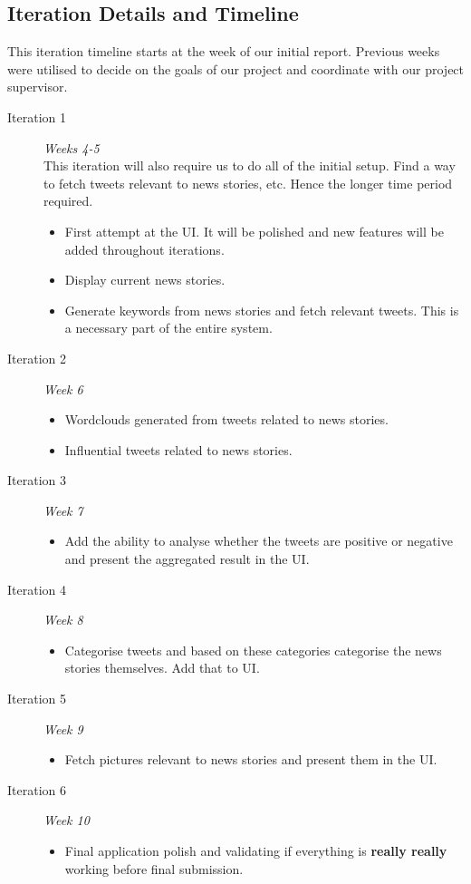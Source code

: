\documentclass[a4paper,12pt]{article}
\begin{document}
  \subsection{Iteration Details and Timeline}
  This iteration timeline starts at the week of our initial report. Previous weeks were utilised to decide on the goals of our project and coordinate with our project supervisor.
  \begin{description}
   \item[Iteration 1] \emph{Weeks 4-5}\\
   This iteration will also require us to do all of the initial setup. Find a way to fetch tweets relevant to news stories, etc. Hence the longer time period required.
   \begin{itemize}
     \item First attempt at the UI. It will be polished and new features will be added throughout iterations.
     \item Display current news stories.
     \item Generate keywords from news stories and fetch relevant tweets. This is a necessary part of the entire system.
   \end{itemize}
   \item[Iteration 2] \emph{Week 6}
   \begin{itemize}
     \item Wordclouds generated from tweets related to news stories.
     \item Influential tweets related to news stories.
   \end{itemize}
   \item[Iteration 3] \emph{Week 7}
   \begin{itemize}
     \item Add the ability to analyse whether the tweets are positive or negative and present the aggregated result in the UI.
   \end{itemize}
   \item[Iteration 4] \emph{Week 8}
   \begin{itemize}
     \item Categorise tweets and based on these categories categorise the news stories themselves. Add that to UI.
   \end{itemize}
   \item[Iteration 5] \emph{Week 9}
   \begin{itemize}
     \item Fetch pictures relevant to news stories and present them in the UI.
   \end{itemize}
   \item[Iteration 6] \emph{Week 10}
   \begin{itemize}
     \item Final application polish and validating if everything is \textbf{really really} working before final submission.
   \end{itemize}
  \end{description}
\end{document}
